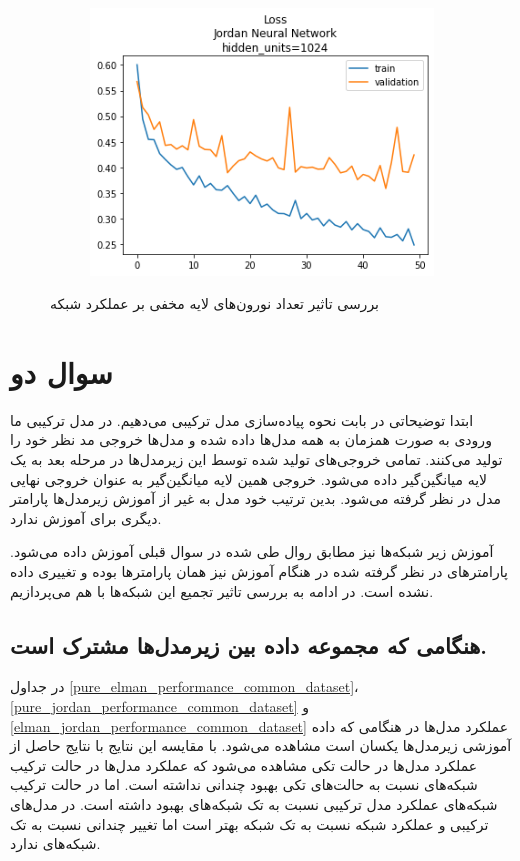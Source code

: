 \documentclass[12pt, a4paper]{article}
\begin{document}
\begin{figure}
\begin{subfigure}{0.45\linewidth}
        \includegraphics[width=0.9\linewidth]{images/q1/jordan/loss_Jordan Neural Networkhidden_units=1024.png}
    \end{subfigure}
    \caption{بررسی تاثیر تعداد نورون‌های لایه مخفی بر عملکرد شبکه }
    \label{analysing_impact_of_hidden_units_on_jordan_network}
\end{figure}

\clearpage

\section*{سوال دو}

ابتدا توضیحاتی در بابت نحوه پیاده‌سازی مدل‌ ترکیبی می‌دهیم. در مدل ترکیبی ما ورودی به صورت همزمان به همه مدل‌ها
داده شده و مدل‌ها خروجی مد نظر خود را تولید می‌کنند. تمامی خروجی‌های تولید شده توسط این زیرمدل‌ها در مرحله بعد به یک
لایه میانگین‌گیر داده می‌شود. خروجی همین لایه میانگین‌گیر به عنوان خروجی نهایی مدل در نظر گرفته می‌شود.
بدین ترتیب خود مدل به غیر از آموزش زیرمدل‌ها پارامتر دیگری برای آموزش ندارد.

آموزش زیر شبکه‌ها نیز مطابق روال طی شده در سوال قبلی آموزش داده می‌شود. پارامتر‌های در نظر گرفته شده در هنگام
آموزش نیز همان پارامتر‌ها بوده و تغییری داده نشده است. در ادامه به بررسی تاثیر تجمیع این شبکه‌ها با هم می‌پردازیم.

\subsection*{هنگامی که مجموعه داده بین زیرمدل‌ها مشترک است.}

در جداول \ref{pure_elman_performance_common_dataset}، \ref{pure_jordan_performance_common_dataset}
و \ref{elman_jordan_performance_common_dataset} عملکرد مدل‌ها در هنگامی که داده‌ آموزشی زیرمدل‌ها یکسان است مشاهده می‌شود.
با مقایسه این نتایج با نتایج حاصل از عملکرد مدل‌ها در حالت تکی مشاهده می‌شود که عملکرد مدل‌ها در حالت ترکیب شبکه‌های
 نسبت به حالت‌های تکی بهبود چندانی نداشته است. اما در حالت ترکیب شبکه‌های  عملکرد مدل
ترکیبی نسبت به تک شبکه‌های  بهبود داشته است. در مدل‌های ترکیبی  و  عملکرد شبکه نسبت
به تک شبکه  بهتر است اما تغییر چندانی نسبت به تک شبکه‌های  ندارد.
\end{document}
